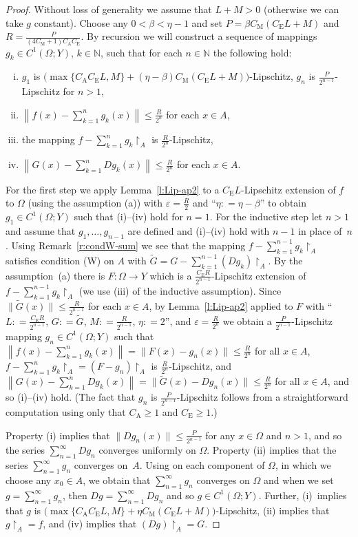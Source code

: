 \documentclass[a4paper,twoside,10pt,reqno,draft]{amsart}
\let\wtilde=\widetilde
\theoremstyle{definition}
\theoremstyle{remark}
\newcommand\norm[1]{\mathopen\|#1\mathclose\|}
\newcommand\norma[1]{\left\|#1\right\|}
\newcommand\ve{\varepsilon}
\newcommand\Om{\Omega}
\newcommand\N{{\mathbb N}}
\newcommand\restr[1]{\mathclose\restriction_{#1}}
\newcommand\eqdef{\mathrel{\mathop:}=}
\newcommand\cW{(W)}
\newcommand\cCA{C_{\mathrm A}}
\newcommand\cCM{C_{\mathrm M}}
\newcommand\cCE{C_{\mathrm E}}
\begin{document}
\begin{proof}
Without loss of generality we assume that $L+M>0$ (otherwise we can take $g$ constant).
Choose any $0<\beta<\eta-1$ and set $P=\beta\cCM(\cCE L+M)$ and $R=\frac P{(4\cCM+1)\cCA\cCE}$.
By recursion we will construct a sequence of mappings $g_k\in C^1(\Om;Y)$, $k\in\N$, such that for each $n\in\N$ the following hold:
\begin{enumerate}[(i)]
\item $g_1$ is $\bigl(\max\{\cCA\cCE L,M\}+(\eta-\beta)\cCM(\cCE L+M)\bigr)$-Lipschitz, $g_n$ is $\frac P{2^{n-1}}$-Lipschitz for $n>1$,
\item $\norma{f(x)-\sum_{k=1}^ng_k(x)}\le\frac R{2^n}$ for each $x\in A$,
\item the mapping $f-\sum_{k=1}^ng_k\restr A$ is $\frac R{2^n}$-Lipschitz,
\item $\norma{G(x)-\sum_{k=1}^nDg_k(x)}\le\frac R{2^n}$ for each $x\in A$.
\end{enumerate}
For the first step we apply Lemma~\ref{l:Lip-ap2} to a $\cCE L$-Lipschitz extension of $f$ to $\Om$ (using the assumption (a)) with $\ve=\frac R2$ and ``$\eta\eqdef\eta-\beta$'' to obtain $g_1\in C^1(\Om;Y)$ such that (i)--(iv) hold for $n=1$.
For the inductive step let $n>1$ and assume that $g_1,\dotsc,g_{n-1}$ are defined and (i)--(iv) hold with $n-1$ in place of~$n$.
Using Remark~\ref{r:condW-sum} we see that the mapping $f-\sum_{k=1}^{n-1}g_k\restr A$ satisfies condition {\cW} on $A$ with $\wtilde G=G-\sum_{k=1}^{n-1}(Dg_k)\restr A$.
By the assumption~(a) there is $F\colon\Om\to Y$ which is a $\frac{\cCE R}{2^{n-1}}$-Lipschitz extension of $f-\sum_{k=1}^{n-1}g_k\restr A$ (we use (iii) of the inductive assumption).
Since $\norm{\wtilde G(x)}\le\frac R{2^{n-1}}$ for each $x\in A$, by Lemma~\ref{l:Lip-ap2} applied to $F$ with ``$L\eqdef\frac{\cCE R}{2^{n-1}}$, $G\eqdef\wtilde G$, $M\eqdef\frac R{2^{n-1}}$, $\eta\eqdef2$'', and $\ve=\frac R{2^n}$
we obtain a $\frac P{2^{n-1}}$-Lipschitz mapping $g_n\in C^1(\Om;Y)$ such that $\norma{f(x)-\sum_{k=1}^ng_k(x)}=\norm{F(x)-g_n(x)}\le\frac R{2^n}$ for all $x\in A$,
$f-\sum_{k=1}^ng_k\restr A=(F-g_n)\restr A$ is $\frac R{2^n}$-Lipschitz,
and $\norma{G(x)-\sum_{k=1}^nDg_k(x)}=\norm{\wtilde G(x)-Dg_n(x)}\le\frac R{2^n}$ for all $x\in A$, and so (i)--(iv) hold.
(The fact that $g_n$ is $\frac P{2^{n-1}}$-Lipschitz follows from a straightforward computation using only that $\cCA\ge1$ and $\cCE\ge1$.)

Property (i) implies that $\norm{Dg_n(x)}\le\frac P{2^{n-1}}$ for any $x\in\Om$ and $n>1$, and so the series $\sum_{n=1}^\infty Dg_n$ converges uniformly on $\Om$.
Property (ii) implies that the series $\sum_{n=1}^\infty g_n$ converges on~$A$.
Using \cite[(8.6.5)]{Die} on each component of $\Om$, in which we choose any $x_0\in A$, we obtain that $\sum_{n=1}^\infty g_n$ converges on $\Om$
and when we set $g=\sum_{n=1}^\infty g_n$, then $Dg=\sum_{n=1}^\infty Dg_n$ and so $g\in C^1(\Om;Y)$.
Further, (i)~implies that $g$ is $\bigl(\max\{\cCA C_{\mathrm E}L,M\}+\eta\cCM(C_{\mathrm E}L+M)\bigr)$-Lipschitz, (ii) implies that $g\restr A=f$, and (iv) implies that $(Dg)\restr A=G$.
\end{proof}
\end{document}
